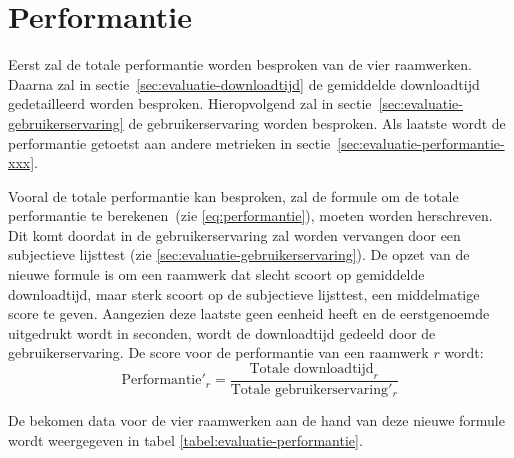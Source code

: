 \section{Performantie}
\label{sec:evaluatie-performantie}

Eerst zal de totale performantie worden besproken van de vier raamwerken.
Daarna zal in sectie~\ref{sec:evaluatie-downloadtijd} de gemiddelde downloadtijd gedetailleerd worden besproken.
Hieropvolgend zal in sectie~\ref{sec:evaluatie-gebruikerservaring} de gebruikerservaring worden besproken.
Als laatste wordt de performantie getoetst aan andere metrieken in sectie~\ref{sec:evaluatie-performantie-xxx}.

Vooral de totale performantie kan besproken, zal de formule om de totale performantie te berekenen~(zie \ref{eq:performantie}), moeten worden herschreven.
Dit komt doordat in de gebruikerservaring zal worden vervangen door een subjectieve lijsttest (zie \ref{sec:evaluatie-gebruikerservaring}). 
De opzet van de nieuwe formule is om een raamwerk dat slecht scoort op gemiddelde downloadtijd, maar sterk scoort op de subjectieve lijsttest, een middelmatige score te geven.
Aangezien deze laatste geen eenheid heeft en de eerstgenoemde uitgedrukt wordt in seconden, wordt de downloadtijd gedeeld door de gebruikerservaring. De score voor de performantie van een raamwerk $r$ wordt:
\begin{equation}
  \text{Performantie}'_r = \frac{\text{Totale downloadtijd}_r}{\text{Totale gebruikerservaring}'_r}
  \label{eq:performantie-enhanced}
\end{equation}

De bekomen data voor de vier raamwerken aan de hand van deze nieuwe formule wordt weergegeven in tabel \ref{tabel:evaluatie-performantie}.

\begin{table}[H]
\centering
{}
\caption{Overzicht van performantie voor \st{}~(\sta), \kendo{}~(\kendoa), \jqm{}~(\jqma) en \lungo{}~(\lungoa). Minder is beter.}
\label{tabel:evaluatie-performantie}
\end{table}

